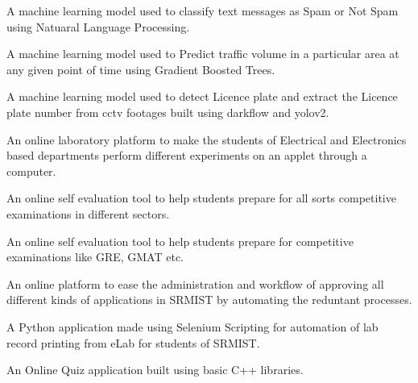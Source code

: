 \documentclass[]{surya-resume}
\begin{document}
\begin{minipage}[t]{1\textwidth}

A machine learning model used to classify text messages as Spam or Not Spam using Natuaral Language Processing.
\sectionsep

A machine learning model used to Predict traffic volume in a particular area at any given point of time using Gradient Boosted Trees.
\sectionsep

A machine learning model used to detect Licence plate and extract the Licence plate number from cctv footages built using darkflow and yolov2.
\sectionsep

An online laboratory platform to make the students of Electrical and Electronics based departments perform different experiments on an applet through a computer.\sectionsep

An online self evaluation tool to help students prepare for all sorts competitive examinations in different sectors.
\sectionsep

An online self evaluation tool to help students prepare for competitive examinations like GRE, GMAT etc.
\sectionsep

An online platform to ease the administration and workflow of approving all different kinds of applications in SRMIST by automating the reduntant processes. 
\sectionsep

A Python application made using Selenium Scripting for automation of lab record printing from eLab for students of SRMIST.
\sectionsep

An Online Quiz application built using basic C++ libraries.
\end{minipage}
\end{document}
